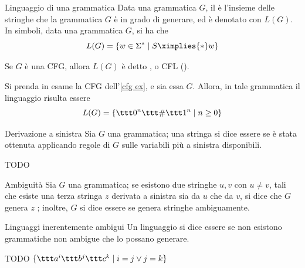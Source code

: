 \documentclass[a4paper, 12pt]{report}
\begin{document}
    \begin{frameddefn}{Linguaggio di una grammatica}
        Data una grammatica $G$, il  è l'insieme delle stringhe che la grammatica $G$ è in grado di generare, ed è denotato con $L(G)$. In simboli, data una grammatica $G$, si ha che $$L(G) = \{w \in \Sigma ^* \mid S \ximplies{*} w\}$$

        Se $G$ è una CFG, allora $L(G)$ è detto , o CFL ().
    \end{frameddefn}

    \begin{example}[CFL]
        Si prenda in esame la CFG dell'\cref{cfg ex}, e sia essa $G$. Allora, in tale grammatica il linguaggio risulta essere $$L(G) = \{\ttt 0 ^n \ttt \# \ttt 1 ^n \mid n \ge 0\}$$
    \end{example}

    \begin{frameddefn}{Derivazione a sinistra}
        Sia $G$ una grammatica; una stringa si dice essere  se è stata ottenuta applicando regole di $G$ sulle variabili più a sinistra disponibili.
    \end{frameddefn}

    \begin{example}
        TODO
    \end{example}

    \begin{frameddefn}{Ambiguità}
        Sia $G$ una grammatica; se esistono due stringhe $u, v$ con $u \neq v$, tali che esiste una terza stringa $z$ derivata a sinistra sia da $u$ che da $v$, si dice che $G$ genera $z$ ; inoltre, $G$ si dice essere  se genera stringhe ambiguamente.
    \end{frameddefn}

    \begin{frameddefn}{Linguaggi inerentemente ambigui}
        Un linguaggio si dice essere  se non esistono grammatiche non ambigue che lo possano generare.
    \end{frameddefn}

    \begin{example}
        TODO $\{\ttt a ^i \ttt b^j \ttt c^k \mid i = j \lor j = k\}$
    \end{example}
\end{document}
